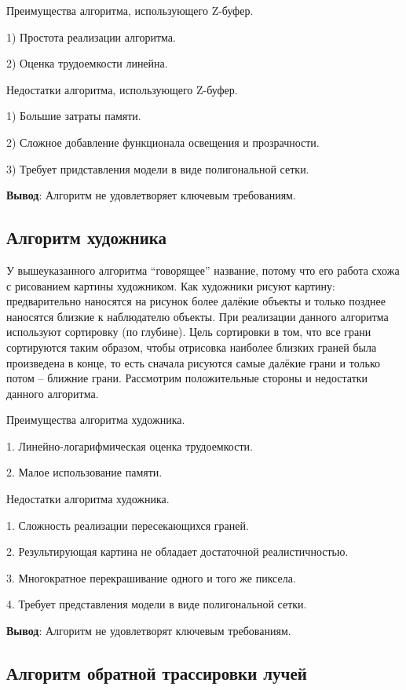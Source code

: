 Преимущества алгоритма, использующего Z-буфер.

1)	Простота реализации алгоритма.

2)  Оценка трудоемкости линейна.

Недостатки алгоритма, использующего Z-буфер.

1) Большие затраты памяти.

2) Сложное добавление функционала освещения и прозрачности.

3) Требует придставления модели в виде полигональной сетки.

\textbf{Вывод}: Алгоритм не удовлетворяет ключевым требованиям.


\subsection{Алгоритм художника}

У вышеуказанного алгоритма “говорящее” название, потому что его работа схожа с рисованием картины художником. Как художники рисуют картину: предварительно наносятся на рисунок более далёкие объекты и только позднее наносятся близкие к наблюдателю объекты. При реализации данного алгоритма используют сортировку (по глубине). Цель сортировки в том, что все грани сортируются таким образом, чтобы отрисовка наиболее близких граней была произведена в конце, то есть сначала рисуются самые далёкие грани и только потом – ближние грани. Рассмотрим положительные стороны и недостатки данного алгоритма.
	
Преимущества алгоритма художника.

1.	Линейно-логарифмическая оценка трудоемкости.

2.	Малое использование памяти. 

Недостатки алгоритма художника.

1.	Сложность реализации пересекающихся граней.

2.	Результирующая картина не обладает достаточной реалистичностью.

3.	Многократное перекрашивание одного и того же пиксела.

4.	Требует представления модели в виде полигональной сетки.

\textbf{Вывод}: Алгоритм не удовлетворят ключевым требованиям.

\subsection{Алгоритм обратной трассировки лучей}

